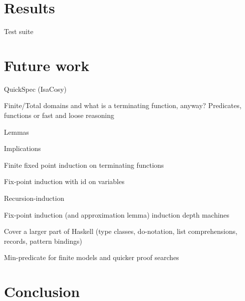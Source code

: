 \documentclass{report}
\begin{document}
\section{Results}

Test suite

\section{Future work}

QuickSpec (IsaCosy)

Finite/Total domains and what is a terminating function, anyway?
Predicates, functions or fast and loose reasoning \cite{fastandloose}

Lemmas

Implications

Finite fixed point induction on terminating functions

Fix-point induction with id on variables

Recursion-induction

Fix-point induction (and approximation lemma) induction depth machines

Cover a larger part of Haskell (type classes, do-notation, list
comprehensions, records, pattern bindings)

Min-predicate for finite models and quicker proof searches

\section{Conclusion}




\end{document}
